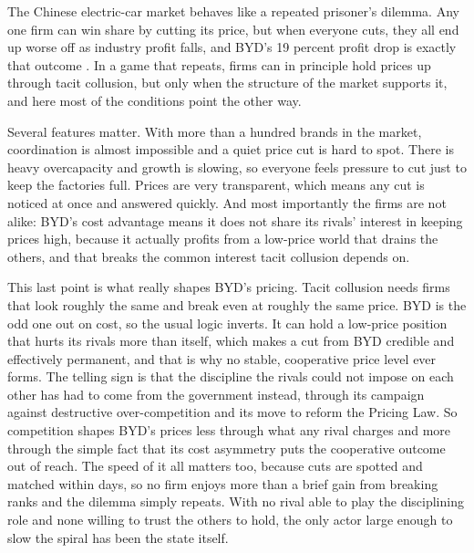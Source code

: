 
The Chinese electric-car market behaves like a repeated prisoner's dilemma. Any one firm can win share by cutting its price, but when everyone cuts, they all end up worse off as industry profit falls, and BYD's 19 percent profit drop is exactly that outcome \cite{byd2025, nagle2018}. In a game that repeats, firms can in principle hold prices up through tacit collusion, but only when the structure of the market supports it, and here most of the conditions point the other way.

Several features matter. With more than a hundred brands in the market, coordination is almost impossible and a quiet price cut is hard to spot. There is heavy overcapacity and growth is slowing, so everyone feels pressure to cut just to keep the factories full. Prices are very transparent, which means any cut is noticed at once and answered quickly. And most importantly the firms are not alike: BYD's cost advantage means it does not share its rivals' interest in keeping prices high, because it actually profits from a low-price world that drains the others, and that breaks the common interest tacit collusion depends on.

This last point is what really shapes BYD's pricing. Tacit collusion needs firms that look roughly the same and break even at roughly the same price. BYD is the odd one out on cost, so the usual logic inverts. It can hold a low-price position that hurts its rivals more than itself, which makes a cut from BYD credible and effectively permanent, and that is why no stable, cooperative price level ever forms. The telling sign is that the discipline the rivals could not impose on each other has had to come from the government instead, through its campaign against destructive over-competition and its move to reform the Pricing Law. So competition shapes BYD's prices less through what any rival charges and more through the simple fact that its cost asymmetry puts the cooperative outcome out of reach. The speed of it all matters too, because cuts are spotted and matched within days, so no firm enjoys more than a brief gain from breaking ranks and the dilemma simply repeats. With no rival able to play the disciplining role and none willing to trust the others to hold, the only actor large enough to slow the spiral has been the state itself.
